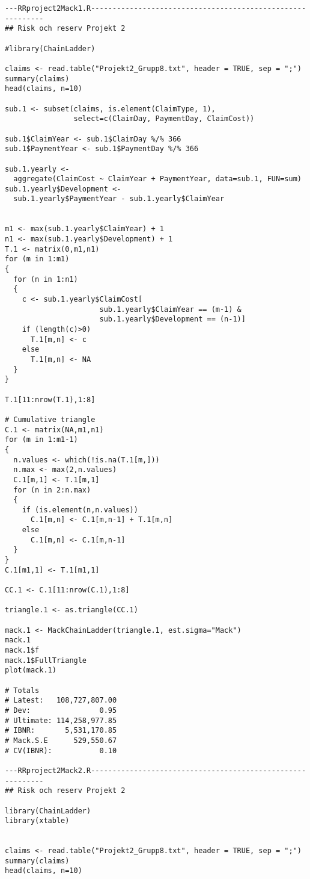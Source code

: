 \documentclass[a4paper]{article}
\begin{document}
\begin{verbatim}
---RRproject2Mack1.R-----------------------------------------------------------
## Risk och reserv Projekt 2

#library(ChainLadder)

claims <- read.table("Projekt2_Grupp8.txt", header = TRUE, sep = ";")
summary(claims)
head(claims, n=10)

sub.1 <- subset(claims, is.element(ClaimType, 1),
                select=c(ClaimDay, PaymentDay, ClaimCost))

sub.1$ClaimYear <- sub.1$ClaimDay %/% 366
sub.1$PaymentYear <- sub.1$PaymentDay %/% 366

sub.1.yearly <-
  aggregate(ClaimCost ~ ClaimYear + PaymentYear, data=sub.1, FUN=sum)
sub.1.yearly$Development <-
  sub.1.yearly$PaymentYear - sub.1.yearly$ClaimYear


m1 <- max(sub.1.yearly$ClaimYear) + 1
n1 <- max(sub.1.yearly$Development) + 1
T.1 <- matrix(0,m1,n1)
for (m in 1:m1)
{
  for (n in 1:n1)
  {
    c <- sub.1.yearly$ClaimCost[
                      sub.1.yearly$ClaimYear == (m-1) &
                      sub.1.yearly$Development == (n-1)]
    if (length(c)>0)
      T.1[m,n] <- c
    else
      T.1[m,n] <- NA
  }
}

T.1[11:nrow(T.1),1:8]

# Cumulative triangle
C.1 <- matrix(NA,m1,n1)
for (m in 1:m1-1)
{
  n.values <- which(!is.na(T.1[m,]))
  n.max <- max(2,n.values)
  C.1[m,1] <- T.1[m,1]
  for (n in 2:n.max)
  {
    if (is.element(n,n.values))
      C.1[m,n] <- C.1[m,n-1] + T.1[m,n]
    else
      C.1[m,n] <- C.1[m,n-1]
  }
}
C.1[m1,1] <- T.1[m1,1]

CC.1 <- C.1[11:nrow(C.1),1:8]

triangle.1 <- as.triangle(CC.1)

mack.1 <- MackChainLadder(triangle.1, est.sigma="Mack")
mack.1
mack.1$f
mack.1$FullTriangle
plot(mack.1)

# Totals
# Latest:   108,727,807.00
# Dev:                0.95
# Ultimate: 114,258,977.85
# IBNR:       5,531,170.85
# Mack.S.E      529,550.67
# CV(IBNR):           0.10

---RRproject2Mack2.R-----------------------------------------------------------
## Risk och reserv Projekt 2

library(ChainLadder)
library(xtable)


claims <- read.table("Projekt2_Grupp8.txt", header = TRUE, sep = ";")
summary(claims)
head(claims, n=10)


\end{verbatim}
\end{document}
